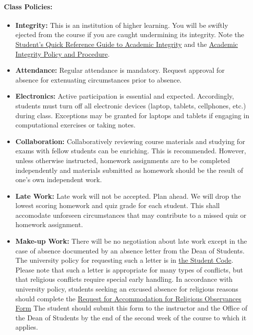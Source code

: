 \documentclass[11pt, a4paper]{article}
\begin{document}
\paragraph{Class Policies:}

\begin{itemize}
\item[] \textbf{Integrity:} This is an institution of higher
learning. You will be swiftly ejected from the course if you are caught
undermining its integrity. Note the
\href{http://www.provost.illinois.edu/academicintegrity/students.html}{Student's
Quick Reference Guide to Academic Integrity} and the
\href{http://studentcode.illinois.edu/article1_part4_1-401.html}{Academic
Integrity Policy and Procedure}.
\item[] \textbf{Attendance:} Regular attendance is mandatory. Request approval for absence for extenuating circumstances prior to absence.
\item[] \textbf{Electronics:} Active participation is essential and expected.
        Accordingly, students must turn off all electronic devices (laptop,
        tablets, cellphones, etc.) during class. Exceptions may be granted for
        laptops and tablets if engaging in computational exercises or taking notes.
\item[] \textbf{Collaboration:} Collaboratively reviewing course materials and studying for exams with fellow students can be enriching.  This is recommended.  However, unless otherwise instructed, homework assignments are to be completed independently and materials submitted as homework should be the result of one's own independent work.
\item[] \textbf{Late Work:} Late work will not be accepted. Plan ahead.
        We will drop the lowest scoring homework and quiz grade for each
        student. This shall accomodate unforseen circumstances that may
        contribute to a missed quiz or homework assignment.

\item[] \textbf{Make-up Work:} There will be no negotiation about late work
        except in the case of absence documented by an absence letter from the
        Dean of Students.  The university policy for requesting such a letter
        is in
        \href{http://studentcode.illinois.edu/article1_part5_1-501.html}{the
        Student Code}. Please note that such a letter is appropriate for many
        types of conflicts, but that religious conflicts require special early
        handling. In accordance with university policy, students seeking an
        excused absence for religious reasons should complete the
	\href{http://odos.illinois.edu/community-of-care/resources/students/religious-observances/}{Request for Accommodation for Religious Observances Form}
        The student should submit this
        form to the instructor and the Office of the Dean of Students by the end of the
        second week of the course to which it applies.



\end{itemize}
\end{document}
